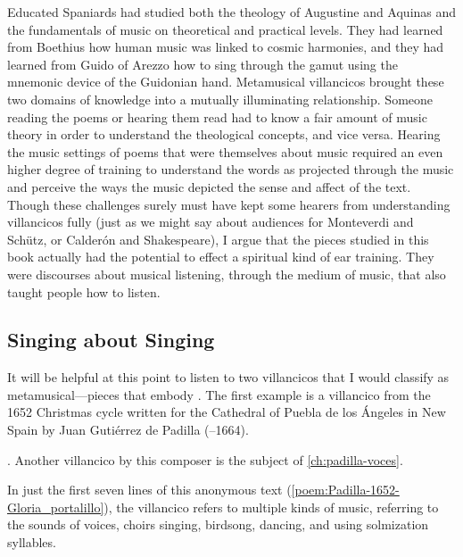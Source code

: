 Educated Spaniards had studied both the theology of Augustine and Aquinas and  
the fundamentals of music on theoretical and practical levels. 
They had learned from Boethius how human music was linked to cosmic harmonies,
and they had learned from Guido of Arezzo how to sing through the gamut using
the mnemonic device of the Guidonian hand.
Metamusical villancicos brought these two domains of knowledge into a mutually
illuminating relationship.
Someone reading the poems or hearing them read had to know a fair amount of
music theory in order to understand the theological concepts, and vice versa.
Hearing the music settings of poems that were themselves about music required
an even higher degree of training to understand the words as projected through
the music and perceive the ways the music depicted the sense and affect of the
text.
Though these challenges surely must have kept some hearers from understanding
villancicos fully (just as we might say about audiences for Monteverdi and
Schütz, or Calderón and Shakespeare), I argue that the pieces studied in this
book actually had the potential to effect a spiritual kind of ear training. 
They were discourses about musical listening, through the medium of music, that
also taught people how to listen.

\subsection{Singing about Singing}

It will be helpful at this point to listen to two villancicos that I would
classify as metamusical---pieces that embody .%
    \autocites{Murata:Singing}
    [\XXX]{Illari:Polychoral}
The first example is a villancico from the 1652 Christmas cycle written for the
Cathedral of Puebla de los Ángeles in New Spain by Juan Gutiérrez de Padilla
(--1664).%
\begin{Footnote}
    . 
    Another villancico by this composer is the subject of
    \cref{ch:padilla-voces}.
\end{Footnote}
In just the first seven lines of this anonymous text
(\cref{poem:Padilla-1652-Gloria_portalillo}), the villancico refers to multiple
kinds of music, referring to the sounds of voices, choirs singing, birdsong,
dancing, and using solmization syllables.

